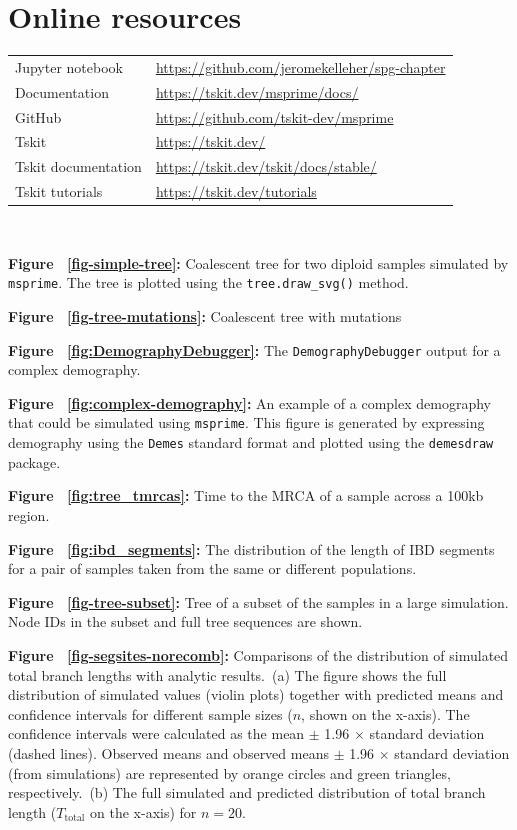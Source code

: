 \documentclass[graybox]{svmult}
\newcommand{\msprime}[0]{\texttt{msprime}}
\begin{document}
\section*{Online resources}

\begin{tabular}{ll}
Jupyter notebook & \url{https://github.com/jeromekelleher/spg-chapter} \\
Documentation & \url{https://tskit.dev/msprime/docs/} \\
GitHub & \url{https://github.com/tskit-dev/msprime} \\
Tskit & \url{https://tskit.dev/} \\
Tskit documentation & \url{https://tskit.dev/tskit/docs/stable/} \\
Tskit tutorials & \url{https://tskit.dev/tutorials} \\
\end{tabular}



\newpage

 \

\textbf{Figure ~\ref{fig-simple-tree}:} Coalescent tree for two diploid samples
simulated by \msprime.
The tree is plotted using the \texttt{tree.draw\_svg()} method.

\textbf{Figure ~\ref{fig-tree-mutations}:} Coalescent tree with mutations

\textbf{Figure ~\ref{fig:DemographyDebugger}:} The \texttt{DemographyDebugger} output for a complex demography.

\textbf{Figure ~\ref{fig:complex-demography}:} An example of a complex demography that could be
simulated using \msprime. This figure is generated by expressing demography using the
\texttt{Demes} standard format and plotted using the \texttt{demesdraw} package.

\textbf{Figure ~\ref{fig:tree_tmrcas}:} Time to the MRCA of
a sample across a 100kb region.

\textbf{Figure ~\ref{fig:ibd_segments}:} The distribution of the length of IBD
segments for a pair of samples taken from the same or different populations.

\textbf{Figure ~\ref{fig-tree-subset}:} Tree of a subset of the samples in a large
simulation. Node IDs in the subset and full tree sequences are shown.

\textbf{Figure ~\ref{fig-segsites-norecomb}:} Comparisons of the distribution of simulated total branch lengths
with analytic results.\
(a) The figure shows the full distribution of simulated values (violin plots) together with predicted means and
confidence intervals for different sample sizes ($n$, shown on the x-axis). The confidence intervals were calculated as the
mean $\pm$ 1.96 $\times$ standard deviation (dashed lines). Observed means and observed means $\pm$ 1.96 $\times$ standard deviation (from simulations) are represented by orange circles
and green triangles, respectively.\
(b) The full simulated and predicted distribution of total branch length ($T_\mathrm{total}$ on the x-axis) for $n = 20$.
\end{document}

